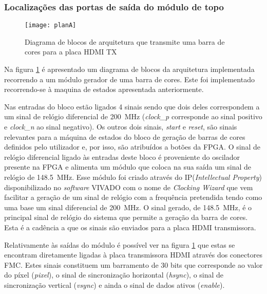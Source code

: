 \subsubsection*{Localizações das portas de saída do módulo de topo} 

\begin{figure}[h!]
	\begin{center}
		\leavevmode
		\texttt{[image: planA]}
		\caption{Diagrama de blocos de arquitetura que transmite uma barra de cores para a placa HDMI TX}
		\label{fig:planA}
	\end{center}
\end{figure}

Na figura \ref{fig:planA} é apresentado um diagrama de blocos da arquitetura implementada recorrendo a um módulo gerador de uma barra de cores. Este foi implementado recorrendo-se à maquina de estados apresentada anteriormente.

Nas entradas do bloco estão ligados 4 sinais sendo que dois deles correspondem a um sinal de relógio diferencial de \SI{200}{\mega\hertz} (\textit{clock\_p} corresponde ao sinal positivo e \textit{clock\_n} ao sinal negativo). Os outros dois sinais, \textit{start} e \textit{reset}, são sinais relevantes para a máquina de estados do bloco de geração de barras de cores definidos pelo utilizador e, por isso, são atribuídos a botões da FPGA. O sinal de relógio diferencial ligado às entradas deste bloco é proveniente do oscilador presente na FPGA e alimenta um módulo que coloca na sua saída um sinal de relógio de \SI{148.5}{\mega\hertz}. Esse módulo foi criado através do IP(\textit{Intellectual Property}) disponibilizado no \textit{software} VIVADO com o nome de \textit{Clocking Wizard} que vem facilitar a geração de um sinal de relógio com a frequência pretendida tendo como uma base um sinal diferencial de \SI{200}{\mega\hertz}. O sinal gerado, de \SI{148.5}{\mega\hertz}, é o principal sinal de relógio do sistema que permite a geração da barra de cores. Esta é a cadência a que os sinais são enviados para a placa HDMI transmissora.

Relativamente às saídas do módulo é possível ver na figura \ref{fig:planA} que estas se encontram diretamente ligadas à placa transmissora HDMI através dos conectores FMC. Estes sinais constituem um barramento de 30 bits que corresponde ao valor do píxel (\textit{pixel}), o sinal de sincronização horizontal (\textit{hsync}), o sinal de sincronização vertical (\textit{vsync}) e ainda o sinal de dados ativos (\textit{enable}).

